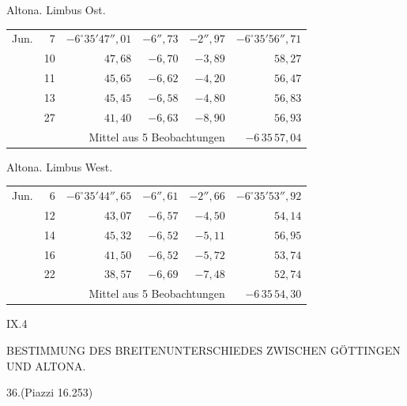 \noindent\begin{minipage}[t]{.495\textwidth}\centering Altona. Limbus Ost.\par\smallskip
{\scriptsize\setlength{\tabcolsep}{1pt}\renewcommand{\arraystretch}{1.2}\begin{tabular}{lr|r|r|r|r|}
Jun.&7&$-6^\circ35'47''{,}01$&$-6''{,}73$&$-2''{,}97$&$-6^\circ35'56''{,}71$\\
&10&$47{,}68$&$-6{,}70$&$-3{,}89$&$58{,}27$\\
&11&$45{,}65$&$-6{,}62$&$-4{,}20$&$56{,}47$\\
&13&$45{,}45$&$-6{,}58$&$-4{,}80$&$56{,}83$\\
&27&$41{,}40$&$-6{,}63$&$-8{,}90$&$56{,}93$\\
\cline{6-6}\multicolumn{5}{r}{Mittel aus 5 Beobachtungen}&$-6\,35\,57{,}04$
\end{tabular}}\end{minipage}\hfill\begin{minipage}[t]{.495\textwidth}\centering Altona. Limbus West.\par\smallskip
{\scriptsize\setlength{\tabcolsep}{1pt}\renewcommand{\arraystretch}{1.2}\begin{tabular}{lr|r|r|r|r}
Jun.&6&$-6^\circ35'44''{,}65$&$-6''{,}61$&$-2''{,}66$&$-6^\circ35'53''{,}92$\\
&12&$43{,}07$&$-6{,}57$&$-4{,}50$&$54{,}14$\\
&14&$45{,}32$&$-6{,}52$&$-5{,}11$&$56{,}95$\\
&16&$41{,}50$&$-6{,}52$&$-5{,}72$&$53{,}74$\\
&22&$38{,}57$&$-6{,}69$&$-7{,}48$&$52{,}74$\\
\cline{6-6}\multicolumn{5}{r}{Mittel aus 5 Beobachtungen}&$-6\,35\,54{,}30$
\end{tabular}}\end{minipage}
\par\vspace{4mm}
\noindent IX.\hfill 4\par

\clearpage
\noindent{}\parbox[t]{\dimexpr\textwidth-10mm\relax}{\centering\scriptsize BESTIMMUNG DES BREITENUNTERSCHIEDES ZWISCHEN GÖTTINGEN UND ALTONA.}\par
\begin{center}36.\quad (Piazzi 16.253)\end{center}

